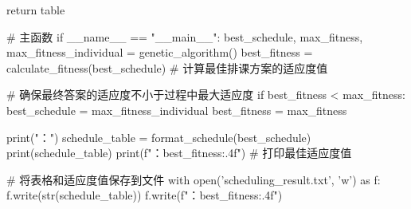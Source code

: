 \documentclass{ctexart}
\begin{document}
\begin{pythoncode}
	    return table
	
	
	# 主函数
	if __name__ == "__main__":
	    best_schedule, max_fitness, max_fitness_individual = genetic_algorithm()
	    best_fitness = calculate_fitness(best_schedule)  # 计算最佳排课方案的适应度值
	
	    # 确保最终答案的适应度不小于过程中最大适应度
	    if best_fitness < max_fitness:
	        best_schedule = max_fitness_individual
	        best_fitness = max_fitness
	
	    print("：")
	    schedule_table = format_schedule(best_schedule)
	    print(schedule_table)
	    print(f"：{best_fitness:.4f}")  # 打印最佳适应度值
	
	    # 将表格和适应度值保存到文件
	    with open('scheduling_result.txt', 'w') as f:
	        f.write(str(schedule_table))
	        f.write(f"：{best_fitness:.4f}")
	\end{pythoncode}
\end{document}
